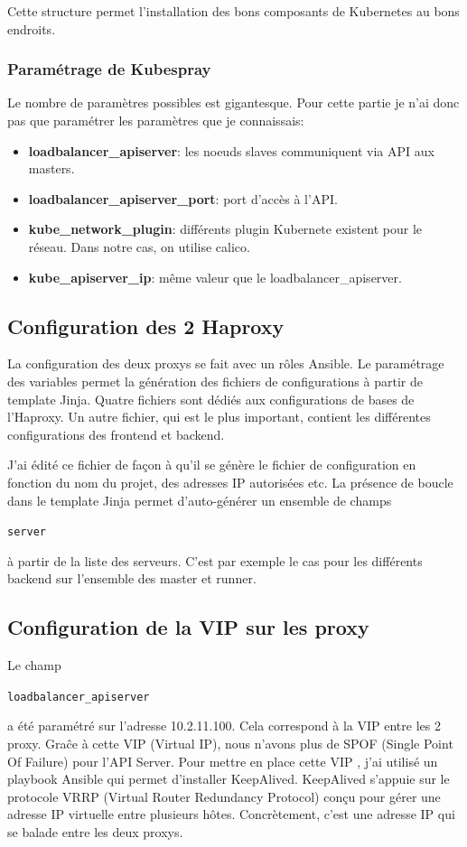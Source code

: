 \documentclass[12pt, a4paper, twoside]{article}
\begin{document}
Cette structure permet l'installation des bons composants de \gls{Kubernetes} au bons endroits.

\subsubsection{Paramétrage de Kubespray}
Le nombre de paramètres possibles est gigantesque.
Pour cette partie je n'ai donc pas que paramétrer les paramètres que je connaissais:
\begin{itemize}
    \item \textbf{loadbalancer\_apiserver}: les noeuds slaves communiquent via \gls{API} aux masters.
    \item \textbf{loadbalancer\_apiserver\_port}: port d'accès à l'\gls{API}.
    \item \textbf{kube\_network\_plugin}: différents plugin Kubernete existent pour le réseau.
    Dans notre cas, on utilise calico.
    \item \textbf{kube\_apiserver\_ip}: même valeur que le loadbalancer\_apiserver.
\end{itemize}

\subsection{Configuration des 2 Haproxy}
La configuration des deux proxys se fait avec un rôles \gls{Ansible}.
Le paramétrage des variables permet la génération des fichiers de configurations à partir de template \gls{Jinja}.
Quatre fichiers sont dédiés aux configurations de bases de l'Haproxy.
Un autre fichier, qui est le plus important, contient les différentes configurations des frontend et backend.

J'ai édité ce fichier de façon à qu'il se génère le fichier de configuration en fonction du nom du projet, des adresses \gls{IP} autorisées etc.
La présence de boucle dans le template \gls{Jinja} permet d'auto-générer un ensemble de champs \begin{code}\texttt{server}\end{code} à partir de la liste des serveurs.
C'est par exemple le cas pour les différents backend sur l'ensemble des master et runner.

\subsection{Configuration de la VIP sur les proxy}
Le champ \begin{code}\texttt{loadbalancer\_apiserver}\end{code} a été paramétré sur l'adresse 10.2.11.100.
Cela correspond à la \gls{VIP} entre les 2 proxy.
Graĉe à cette \gls{VIP}  (Virtual \gls{IP}), nous n'avons plus de SPOF (Single Point Of Failure) pour l'\gls{API} Server.
Pour mettre en place cette \gls{VIP} , j'ai utilisé un playbook \gls{Ansible} qui permet d'installer KeepAlived.
KeepAlived s'appuie sur le protocole VRRP (Virtual Router Redundancy Protocol) conçu pour gérer une adresse \gls{IP} virtuelle entre plusieurs hôtes.
Concrètement, c'est une adresse \gls{IP} qui se balade entre les deux proxys.
\end{document}
